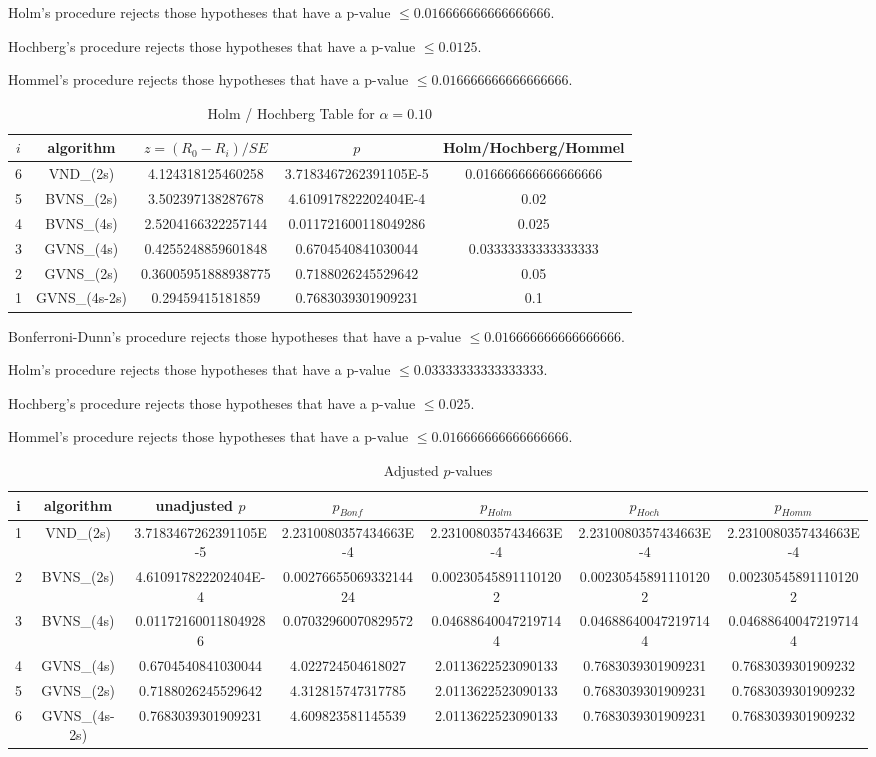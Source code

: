 \documentclass[a4paper,10pt]{article}
\begin{document}
\begin{landscape}
Holm's procedure rejects those hypotheses that have a p-value $\le0.016666666666666666$.


Hochberg's procedure rejects those hypotheses that have a p-value $\le0.0125$.


Hommel's procedure rejects those hypotheses that have a p-value $\le0.016666666666666666$.


\begin{table}[!htp]
\centering\tiny
\caption{Holm / Hochberg Table for $\alpha=0.10$}
\begin{tabular}{ccccc}
$i$&algorithm&$z=(R_0 - R_i)/SE$&$p$&Holm/Hochberg/Hommel\\
\hline
6&VND_(2s)&4.124318125460258&3.7183467262391105E-5&0.016666666666666666\\
5&BVNS_(2s)&3.502397138287678&4.610917822202404E-4&0.02\\
4&BVNS_(4s)&2.5204166322257144&0.011721600118049286&0.025\\
3&GVNS_(4s)&0.4255248859601848&0.6704540841030044&0.03333333333333333\\
2&GVNS_(2s)&0.36005951888938775&0.7188026245529642&0.05\\
1&GVNS_(4s-2s)&0.29459415181859&0.7683039301909231&0.1\\
\hline
\end{tabular}
\end{table}
Bonferroni-Dunn's procedure rejects those hypotheses that have a p-value $\le0.016666666666666666$.


Holm's procedure rejects those hypotheses that have a p-value $\le0.03333333333333333$.


Hochberg's procedure rejects those hypotheses that have a p-value $\le0.025$.


Hommel's procedure rejects those hypotheses that have a p-value $\le0.016666666666666666$.


\begin{table}[!htp]
\centering\tiny
\caption{Adjusted $p$-values}
\begin{tabular}{ccccccc}
i&algorithm&unadjusted $p$&$p_{Bonf}$&$p_{Holm}$&$p_{Hoch}$&$p_{Homm}$\\
\hline
1&VND_(2s)&3.7183467262391105E-5&2.2310080357434663E-4&2.2310080357434663E-4&2.2310080357434663E-4&2.2310080357434663E-4\\
2&BVNS_(2s)&4.610917822202404E-4&0.0027665506933214424&0.002305458911101202&0.002305458911101202&0.002305458911101202\\
3&BVNS_(4s)&0.011721600118049286&0.07032960070829572&0.046886400472197144&0.046886400472197144&0.046886400472197144\\
4&GVNS_(4s)&0.6704540841030044&4.022724504618027&2.0113622523090133&0.7683039301909231&0.7683039301909232\\
5&GVNS_(2s)&0.7188026245529642&4.312815747317785&2.0113622523090133&0.7683039301909231&0.7683039301909232\\
6&GVNS_(4s-2s)&0.7683039301909231&4.609823581145539&2.0113622523090133&0.7683039301909231&0.7683039301909232\\
\hline
\end{tabular}
\end{table}


\end{landscape}
\end{document}
